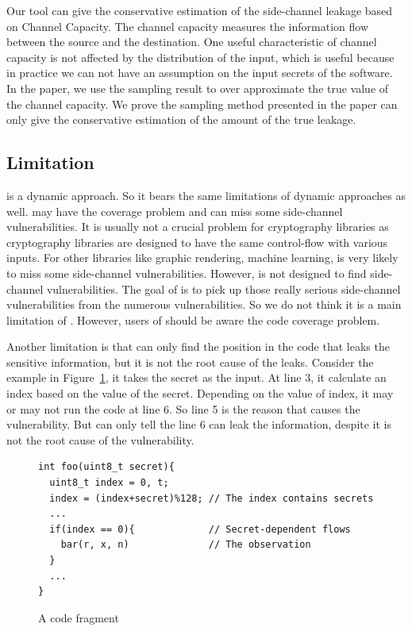 Our tool can give the conservative estimation of the side-channel leakage based on Channel Capacity. The channel capacity measures  the information flow between the source and the destination. One useful characteristic of channel capacity is not affected by the distribution of the input, which is useful because in practice we can not have an assumption on the input secrets of the software. In the paper, we use the sampling result to over approximate the true value of the channel capacity. We prove the sampling method presented in the paper can only give the conservative estimation of the amount of the true leakage.

\subsection{Limitation}
\tool{} is a dynamic approach. So it bears the same limitations of dynamic approaches as well. \tool{} may have the coverage problem and can miss some side-channel vulnerabilities. It is usually not a crucial problem for cryptography libraries as cryptography libraries are designed to have the same control-flow with various inputs. For other libraries like graphic rendering, machine learning, \tool{} is very likely to miss some side-channel vulnerabilities. However, \tool{} is not designed to find side-channel vulnerabilities. The goal of \tool{} is to pick up those really serious side-channel vulnerabilities from the numerous vulnerabilities. So we do not think it is a main limitation of \tool{}. However, users of \tool{} should be aware the code coverage problem.

Another limitation is that \tool{} can only find the position in the code that leaks the sensitive information, but it is not the root cause of the leaks. Consider the example in Figure~\ref{fig:limitation}, it takes the secret as the input. At line 3, it calculate an index based on the value of the secret. Depending on the value of index, it may or may not run the code at line 6. So line 5 is the reason that causes the vulnerability. But \tool{} can only tell the line 6 can leak the information, despite it is not the root cause of the vulnerability.

\begin{figure}
  \centering
  \begin{lstlisting}[xleftmargin=.02\textwidth,xrightmargin=.01\textwidth]
int foo(uint8_t secret){
  uint8_t index = 0, t;
  index = (index+secret)%128; // The index contains secrets
  ...
  if(index == 0){             // Secret-dependent flows
    bar(r, x, n)              // The observation
  }
  ...
}
\end{lstlisting}
  \caption{A code fragment}
  \label{fig:limitation}
\end{figure}
